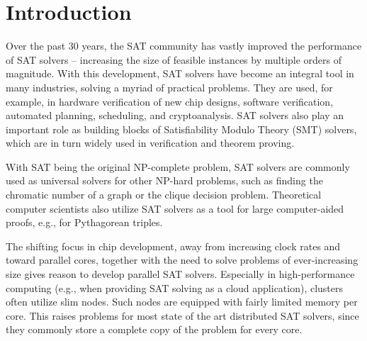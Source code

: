 \documentclass[12pt,a4paper,twoside]{scrartcl}
\numberwithin{equation}{section}
\begin{document}

\pagestyle{normal}
\renewcommand\sectionmark[1]{\markboth{\thesection\quad\MakeUppercase{#1}}{\thesection\quad\MakeUppercase{#1}}}
\renewcommand\subsectionmark[1]{\markright{\thesubsection\quad\MakeUppercase{#1}}}

\tableofcontents

\clearpage


\listoffigures
\listoftables

\clearpage


\section{Introduction}

Over the past 30 years, the SAT community has vastly improved the performance of SAT solvers -- increasing the size of feasible instances by multiple orders of magnitude. With this development, SAT solvers have become an integral tool in many industries, solving a myriad of practical problems. They are used, for example, in hardware verification of new chip designs, software verification, automated planning, scheduling, and cryptoanalysis. SAT solvers also play an important role as building blocks of Satisfiability Modulo Theory (SMT) solvers, which are in turn widely used in verification and theorem proving.

With SAT being the original NP-complete problem, SAT solvers are commonly used as universal solvers for other NP-hard problems, such as finding the chromatic number of a graph or the clique decision problem. Theoretical computer scientists also utilize SAT solvers as a tool for large computer-aided proofs, e.g., for Pythagorean triples.

The shifting focus in chip development, away from increasing clock rates and toward parallel cores, together with the need to solve problems of ever-increasing size gives reason to develop parallel SAT solvers. Especially in high-performance computing (e.g., when providing SAT solving as a cloud application), clusters often utilize slim nodes. Such nodes are equipped with fairly limited memory per core. This raises problems for most state of the art distributed SAT solvers, since they commonly store a complete copy of the problem for every core.
\end{document}
